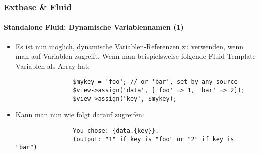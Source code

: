 \begin{frame}[fragile]
	\frametitle{Extbase \& Fluid}
	\framesubtitle{Standalone Fluid: Dynamische Variablennamen (1)}

	\lstset{basicstyle=\tiny\ttfamily}

	\begin{itemize}

		\item Es ist nun möglich, dynamische Variablen-Referenzen zu verwenden, wenn man auf Variablen zugreift.
			Wenn man beispielsweise folgende Fluid Template Variablen als Array hat:

			\begin{lstlisting}
				$mykey = 'foo'; // or 'bar', set by any source
				$view->assign('data', ['foo' => 1, 'bar' => 2]);
				$view->assign('key', $mykey);
			\end{lstlisting}

		\item Kann man nun wie folgt darauf zugreifen:

			\begin{lstlisting}
				You chose: {data.{key}}.
				(output: "1" if key is "foo" or "2" if key is "bar")
			\end{lstlisting}

	\end{itemize}

\end{frame}


